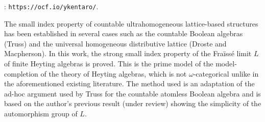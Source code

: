 \documentclass[bsl,meeting]{asl}
\def\urladdr#1{\endgraf\noindent{\it URL Address}: {\tt #1}.}
\newcommand{\NP}{}
\begin{document}
\thispagestyle{empty}


\NP  
{}
\urladdr{https://ocf.io/ykentaro/}

The small index property of countable ultrahomogeneous lattice-based
structures has been established in several cases such
as the countable Boolean algebras (Truss)
and the universal homogeneous distributive lattice (Droste and
Macpherson).
In this work, the strong small index property of
the Fra\"iss\'e limit $L$ of finite Heyting algebras is proved.
This is the prime model of the model-completion of the theory of
Heyting algebras,
which is not $\omega$-categorical unlike
in the aforementioned existing literature.
The method used is an adaptation of the ad-hoc argument used by Truss
for the countable atomless Boolean algebra
and is based on the author's previous result (under review) showing
the simplicity of the automorphism group of $L$.









\vspace*{-0.5\baselineskip}
\end{document}
